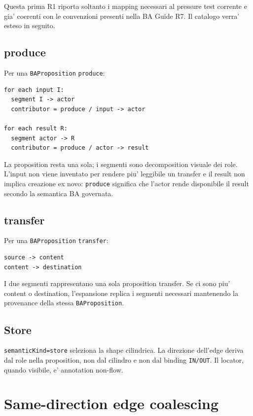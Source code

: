 \documentclass[11pt,a4paper]{article}
\newcommand{\BAP}{\texttt{BAProposition}}
\newcommand{\RuleTag}{\ddtatag{DDTABlue}{PROJECTION RULE}}
\begin{document}
Questa prima R1 riporta soltanto i mapping necessari al pressure test corrente e gia' coerenti con le convenzioni presenti nella BA Guide R7. Il catalogo verra' esteso in seguito.

\subsection{produce}

Per una \BAP{} \texttt{produce}:

\begin{lstlisting}
for each input I:
  segment I -> actor
  contributor = produce / input -> actor

for each result R:
  segment actor -> R
  contributor = produce / actor -> result
\end{lstlisting}

La proposition resta una sola; i segmenti sono decomposition visuale dei role. L'input non viene inventato per rendere piu' leggibile un transfer e il result non implica creazione ex novo: \texttt{produce} significa che l'actor rende disponibile il result secondo la semantica BA governata.

\subsection{transfer}

Per una \BAP{} \texttt{transfer}:

\begin{lstlisting}
source -> content
content -> destination
\end{lstlisting}

I due segmenti rappresentano una sola proposition transfer. Se ci sono piu' content o destination, l'espansione replica i segmenti necessari mantenendo la provenance della stessa \BAP{}.

\subsection{Store}

\texttt{semanticKind=store} seleziona la shape cilindrica. La direzione dell'edge deriva dal role nella proposition, non dal cilindro e non dal binding \texttt{IN/OUT}. Il locator, quando visibile, e' annotation non-flow.

\clearpage
\section{Same-direction edge coalescing}
\RuleTag
\end{document}
